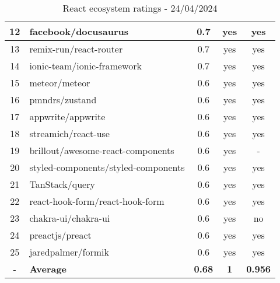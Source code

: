 \begin{table}[H]
{\begin{tabular}{|c|l|c|c|c|}
            12 & facebook/docusaurus                 & 0.7                & yes                        & yes                \\ \hline
            13 & remix-run/react-router              & 0.7                & yes                        & yes                \\ \hline
            14 & ionic-team/ionic-framework          & 0.7                & yes                        & yes                \\ \hline
            15 & meteor/meteor                       & 0.6                & yes                        & yes                \\ \hline
            16 & pmndrs/zustand                      & 0.6                & yes                        & yes                \\ \hline
            17 & appwrite/appwrite                   & 0.6                & yes                        & yes                \\ \hline
            18 & streamich/react-use                 & 0.6                & yes                        & yes                \\ \hline
            19 & brillout/awesome-react-components   & 0.6                & yes                        & -                  \\ \hline
            20 & styled-components/styled-components & 0.6                & yes                        & yes                \\ \hline
            21 & TanStack/query                      & 0.6                & yes                        & yes                \\ \hline
            22 & react-hook-form/react-hook-form     & 0.6                & yes                        & yes                \\ \hline
            23 & chakra-ui/chakra-ui                 & 0.6                & yes                        & no                 \\ \hline
            24 & preactjs/preact                     & 0.6                & yes                        & yes                \\ \hline
            25 & jaredpalmer/formik                  & 0.6                & yes                        & yes                \\ \hline
            -  & \textbf{Average}                    & \textbf{0.68}      & \textbf{1}                 & \textbf{0.956}     \\ \hline
        \end{tabular}
    }
    \caption{React ecosystem ratings - 24/04/2024}
    \label{tab:metrics:react:ratings}
\end{table}

